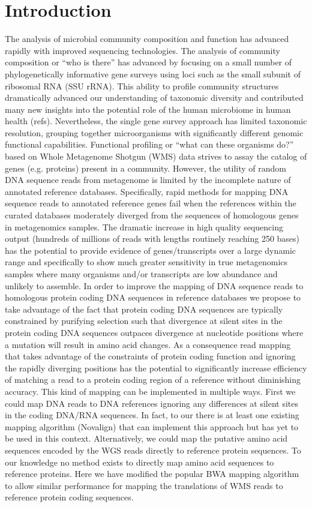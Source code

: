 \section{Introduction} 
The analysis of microbial community composition and function has advanced rapidly with improved sequencing technologies.  The analysis of community composition or “who is there” has advanced by focusing on a small number of phylogenetically informative gene surveys using loci such as the small subunit of ribosomal RNA (SSU rRNA). This ability to profile community structures dramatically advanced our understanding of taxonomic diversity and contributed many new insights into the potential role of the human microbiome in human health (refs).  Nevertheless, the single gene survey approach has limited taxonomic resolution, grouping together microorganisms with significantly different genomic functional capabilities. 
Functional profiling or “what can these organisms do?” based on Whole Metagenome Shotgun (WMS) data strives to assay the catalog of genes (e.g. proteins) present in a community.  However, the utility of random DNA sequence reads from metagenome is limited by the incomplete nature of annotated reference databases.  Specifically, rapid methods for mapping DNA sequence reads to annotated reference genes fail when the references within the curated databases moderately diverged from the sequences of homologous genes in metagenomics samples.  The dramatic increase in high quality sequencing output (hundreds of millions of reads with lengths routinely reaching 250 bases) has the potential to provide evidence of genes/transcripts over a large dynamic range and specifically to show much greater sensitivity in true metagenomics samples where many organisms and/or transcripts are low abundance and unlikely to assemble.  
In order to improve the mapping of DNA sequence reads to homologous protein coding DNA sequences in reference databases we propose to take advantage of the fact that protein coding DNA sequences are typically constrained by purifying selection such that divergence at silent sites in the protein coding DNA sequences outpaces divergence at nucleotide positions where a mutation will result in amino acid changes.  As a consequence read mapping that takes advantage of the constraints of protein coding function and ignoring the rapidly diverging positions has the potential to significantly increase efficiency of matching a read to a protein coding region of a reference without diminishing accuracy.  This kind of mapping can be implemented in multiple ways. First we could map DNA reads to DNA references ignoring any differences at silent sites in the coding DNA/RNA sequences.   In fact, to our there is at least one existing mapping algorithm (Novalign) that can implement this approach but has yet to be used in this context. Alternatively, we could map the putative amino acid sequences encoded by the WGS reads directly to reference protein sequences.  To our knowledge no method exists to directly map amino acid sequences to reference proteins.  Here we have modified the popular BWA mapping algorithm to allow similar performance for mapping the translations of WMS reads to reference protein coding sequences.  
